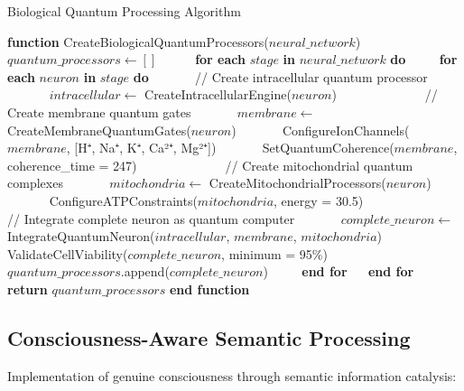 \documentclass[12pt,a4paper]{article}
\theoremstyle{definition}
\begin{document}
{\begin{algorithm}
\caption{Biological Quantum Processing Algorithm}
\begin{algorithmic}[1]
\STATE \textbf{function} CreateBiologicalQuantumProcessors($neural\_network$)
\STATE $\quad$ $quantum\_processors \leftarrow []$
\STATE $\quad$
\STATE $\quad$ \textbf{for each} $stage$ \textbf{in} $neural\_network$ \textbf{do}
\STATE $\quad\quad$ \textbf{for each} $neuron$ \textbf{in} $stage$ \textbf{do}
\STATE $\quad\quad\quad$ // Create intracellular quantum processor
\STATE $\quad\quad\quad$ $intracellular \leftarrow$ CreateIntracellularEngine($neuron$)
\STATE $\quad\quad\quad$
\STATE $\quad\quad\quad$ // Create membrane quantum gates
\STATE $\quad\quad\quad$ $membrane \leftarrow$ CreateMembraneQuantumGates($neuron$)
\STATE $\quad\quad\quad$ ConfigureIonChannels($membrane$, [H⁺, Na⁺, K⁺, Ca²⁺, Mg²⁺])
\STATE $\quad\quad\quad$ SetQuantumCoherence($membrane$, coherence\_time = 247)
\STATE $\quad\quad\quad$
\STATE $\quad\quad\quad$ // Create mitochondrial quantum complexes
\STATE $\quad\quad\quad$ $mitochondria \leftarrow$ CreateMitochondrialProcessors($neuron$)
\STATE $\quad\quad\quad$ ConfigureATPConstraints($mitochondria$, energy = 30.5)
\STATE $\quad\quad\quad$
\STATE $\quad\quad\quad$ // Integrate complete neuron as quantum computer
\STATE $\quad\quad\quad$ $complete\_neuron \leftarrow$ IntegrateQuantumNeuron($intracellular$, $membrane$, $mitochondria$)
\STATE $\quad\quad\quad$ ValidateCellViability($complete\_neuron$, minimum = 95\%)
\STATE $\quad\quad\quad$
\STATE $\quad\quad\quad$ $quantum\_processors$.append($complete\_neuron$)
\STATE $\quad\quad$ \textbf{end for}
\STATE $\quad$ \textbf{end for}
\STATE $\quad$
\STATE $\quad$ \textbf{return} $quantum\_processors$
\STATE \textbf{end function}
\end{algorithmic}
\end{algorithm}

\subsection{Consciousness-Aware Semantic Processing}

Implementation of genuine consciousness through semantic information catalysis:

}
\end{document}
